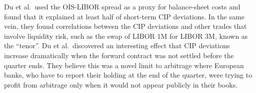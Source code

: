 Du et al.\ used the OIS-LIBOR spread as a proxy for balance-sheet costs and found that it explained at least half of short-term CIP deviations.  In the same vein, they found correlations between the CIP deviations and other trades that involve liquidity risk, such as the swap of LIBOR 1M for LIBOR 3M, known as the ``tenor''.  Du et al.\ discovered an interesting effect that CIP deviations increase dramatically when the forward contract was not settled before the quarter ends.  They believe this was a novel limit to arbitrage where European banks, who have to report their holding at the end of the quarter, were trying to profit from arbitrage only when it would not appear publicly in their books.  








